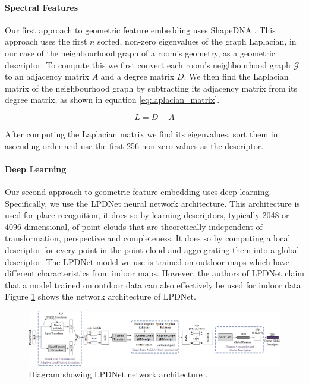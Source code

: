\paragraph{Spectral Features}
Our first approach to geometric feature embedding uses ShapeDNA \citep{reuter_laplacebeltrami_2006}. This approach uses the first \(n\) sorted, non-zero eigenvalues of the graph Laplacian, in our case of the neighbourhood graph of a room's geometry, as a geometric descriptor. To compute this we first convert each room's neighbourhood graph \(\mathcal{G}\) to an adjacency matrix \(A\) and a degree matrix \(D\). We then find the Laplacian matrix of the neighbourhood graph by subtracting its adjacency matrix from its degree matrix, as shown in equation \ref{eq:laplacian_matrix}.

\begin{equation}
    \label{eq:laplacian_matrix}
L = D - A
\end{equation}

After computing the Laplacian matrix we find its eigenvalues, sort them in ascending order and use the first 256 non-zero values as the descriptor. 


\paragraph{Deep Learning}
Our second approach to geometric feature embedding uses deep learning. Specifically, we use the LPDNet neural network architecture. This architecture is used for place recognition, it does so by learning descriptors, typically 2048 or 4096-dimensional, of point clouds that are theoretically independent of transformation, perspective and completeness. It does so by computing a local descriptor for every point in the point cloud and aggregrating them into a global descriptor. The LPDNet model we use is trained on outdoor maps which have different characteristics from indoor maps. However, the authors of LPDNet claim that a model trained on outdoor data can also effectively be used for indoor data. Figure \ref{fig:lpdnet_architecture} shows the network architecture of LPDNet.


\begin{figure}[h]
    \centering
    \includegraphics*[width=\textwidth]{./fig/network_architecture.png}
    \caption{Diagram showing LPDNet network architecture \citep{liu_lpd-net_2019}.}
    \label{fig:lpdnet_architecture}
\end{figure}

